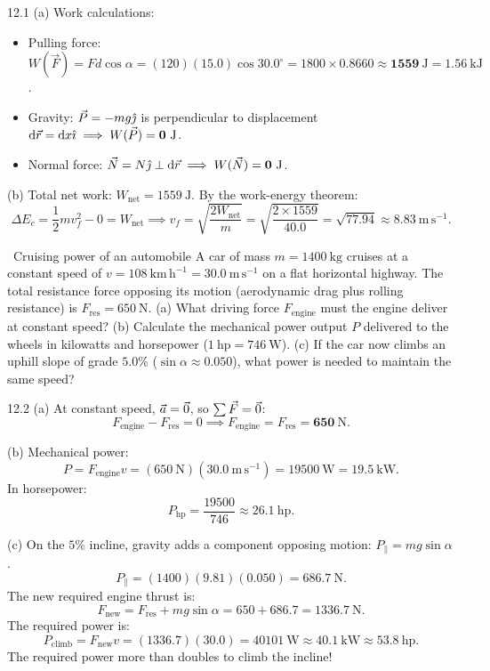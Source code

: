 \begin{solution}{12.1}
(a) Work calculations:
\begin{itemize}[leftmargin=1.4em,itemsep=2pt]
  \item Pulling force: $W(\vec{F}) = F d\cos\alpha = (120)(15.0)\cos 30.0^\circ = 1800\times 0.8660 \approx \mathbf{1559\ \mathrm{J}} = 1.56\ \mathrm{kJ}$.
  \item Gravity: $\vec{P} = -mg\hat{\jmath}$ is perpendicular to displacement $\dd\vec{r} = \dd x\ihat \implies W(\vec{P}) = \mathbf{0\ \mathrm{J}}$.
  \item Normal force: $\vec{N} = N\jhat \perp \dd\vec{r} \implies W(\vec{N}) = \mathbf{0\ \mathrm{J}}$.
\end{itemize}

(b) Total net work: $W_{\text{net}} = 1559\ \mathrm{J}$.
By the work-energy theorem:
\[
\Delta E_c = \frac{1}{2}m v_f^2 - 0 = W_{\text{net}} \implies v_f = \sqrt{\frac{2 W_{\text{net}}}{m}} = \sqrt{\frac{2\times 1559}{40.0}} = \sqrt{77.94} \approx \mathbf{8.83\ \mathrm{m\,s^{-1}}.}
\]
\end{solution}

\begin{exercise}{\warm\ Cruising power of an automobile}
A car of mass $m=1400\ \mathrm{kg}$ cruises at a constant speed of $v=108\ \mathrm{km\,h^{-1}} = 30.0\ \mathrm{m\,s^{-1}}$ on a flat horizontal highway. The total resistance force opposing its motion (aerodynamic drag plus rolling resistance) is $F_{\text{res}} = 650\ \mathrm{N}$.
(a) What driving force $F_{\text{engine}}$ must the engine deliver at constant speed?
(b) Calculate the mechanical power output $P$ delivered to the wheels in kilowatts and horsepower ($1\ \mathrm{hp} = 746\ \mathrm{W}$).
(c) If the car now climbs an uphill slope of grade $5.0\%$ ($\sin\alpha \approx 0.050$), what power is needed to maintain the same speed?
\end{exercise}

\begin{tabletworkspace}[5.5cm]
\end{tabletworkspace}

\begin{solution}{12.2}
(a) At constant speed, $\vec{a} = \vec{0}$, so $\sum\vec{F} = \vec{0}$:
\[
F_{\text{engine}} - F_{\text{res}} = 0 \implies F_{\text{engine}} = F_{\text{res}} = \mathbf{650\ \mathrm{N}.}
\]

(b) Mechanical power:
\[
P = F_{\text{engine}} v = (650\ \mathrm{N})(30.0\ \mathrm{m\,s^{-1}}) = 19500\ \mathrm{W} = \mathbf{19.5\ \mathrm{kW}.}
\]
In horsepower:
\[
P_{\text{hp}} = \frac{19500}{746} \approx \mathbf{26.1\ \mathrm{hp}.}
\]

(c) On the $5\%$ incline, gravity adds a component opposing motion: $P_\parallel = mg\sin\alpha$.
\[
P_\parallel = (1400)(9.81)(0.050) = 686.7\ \mathrm{N}.
\]
The new required engine thrust is:
\[
F_{\text{new}} = F_{\text{res}} + mg\sin\alpha = 650 + 686.7 = 1336.7\ \mathrm{N}.
\]
The required power is:
\[
P_{\text{climb}} = F_{\text{new}} v = (1336.7)(30.0) = 40101\ \mathrm{W} \approx \mathbf{40.1\ \mathrm{kW}} \approx \mathbf{53.8\ \mathrm{hp}.}
\]
The required power more than doubles to climb the incline!
\end{solution}

